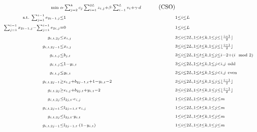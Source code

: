 \documentclass[runningheads]{llncs}
\begin{document}
\begin{align*}
{\scriptstyle\min\;}& {\scriptstyle\alpha\cdot\sum_{j=2}^{k}  c_j \sum_{i=1}^{2L} z_{i,j} + \beta\cdot\sum_{i-1}^L v_i +\gamma\cdot d }&\label{CS} \tag{CSO}\\
{\scriptstyle \text{s.t.}\;   \sum_{j=1}^{i-1} e_{2i-1,j} }&{\scriptstyle \leq 1 }&&{\scriptstyle 1\leq i\leq L} \\
{\scriptstyle        \sum_{j=1}^{i-1} x_{2i-1,j}- \sum_{j=1}^{i-1} e_{2i,j}}&{\scriptstyle=0 }&&{\scriptstyle1\leq i\leq L} \\
 {\scriptstyle      g_{i,t,2j} }&{\scriptstyle\leq x_{i,j} }&&{\scriptstyle 3\leq i \leq 2L, 1\leq t \leq k, 1\leq j\leq\lfloor\frac{i-1}{2} \rfloor}  \\
 {\scriptstyle      g_{i,t,2j-1} }&{\scriptstyle\leq x_{i,j} }&&{\scriptstyle 3\leq i \leq 2L, 1\leq t \leq k, 1\leq j\leq\lfloor\frac{i-1}{2} \rfloor } \\
 {\scriptstyle      g_{i,t,j} }&{\scriptstyle\leq b_{j,t}} &&{\scriptstyle 3\leq i \leq 2L, 1\leq t \leq k, 1\leq j\leq i-2+(i\mod 2)} \\
 {\scriptstyle      g_{i,t,j} }&{\scriptstyle\leq 1-y_{i,t} }&&{\scriptstyle 3\leq i \leq 2L, 1\leq t \leq k, 1\leq j<i, j \mbox{ \scriptsize  odd}}\\
 {\scriptstyle      g_{i,t,j} }&{\scriptstyle\leq y_{i,t} }&&{\scriptstyle 3\leq i \leq 2L, 1\leq t \leq k, 1\leq j<i, j \mbox{ \scriptsize even}}\\
 {\scriptstyle      g_{i,t,2j-1} }&{\scriptstyle\geq e_{i,j} +  b_{2j-1,t} + 1-y_{i,t} -2 }&&{\scriptstyle 3\leq i \leq 2L, 1\leq t \leq k, 1\leq j\leq\lfloor\frac{i-1}{2} \rfloor} \\
 {\scriptstyle      g_{i,t,2j} }&{\scriptstyle\geq e_{i,j} +  b_{2j,t} + y_{i,t} -2 }&&{\scriptstyle 3\leq i \leq 2L, 1\leq t \leq k, 1\leq j\leq\lfloor\frac{i-1}{2} \rfloor} \\
  {\scriptstyle     g_{i,t,2j} }&{\scriptstyle\leq l_{2j,t}\cdot e_{i,j} }&&{\scriptstyle 1\leq i \leq 2L, 1\leq t \leq k, 1\leq j\leq m}\\
  {\scriptstyle     g_{i,t,2j-1} }&{\scriptstyle\leq l_{2j-1,t}\cdot e_{i,j} }&&{\scriptstyle 1\leq i \leq 2L, 1\leq t \leq k, 1\leq j\leq m}\\
   {\scriptstyle    g_{i,t,2j} }&{\scriptstyle\leq l_{2j,t}\cdot y_{i,t} }&&{\scriptstyle 1\leq i \leq 2L, 1\leq t \leq k, 1\leq j\leq m}\\
  {\scriptstyle     g_{i,t,2j-1} }&{\scriptstyle\leq l_{2j-1,t}\cdot (1-y_{i,t}) }&&{\scriptstyle 1\leq i \leq 2L, 1\leq t \leq k, 1\leq j\leq m}\\

\end{align*}
\end{document}
